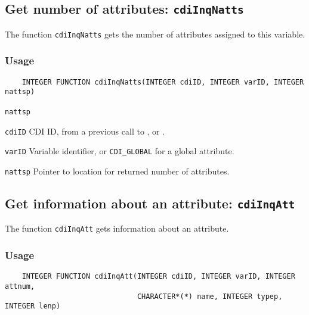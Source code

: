 

\subsection{Get number of attributes: \texttt{cdiInqNatts}}
\label{cdiInqNatts}

The function {\texttt{cdiInqNatts}} gets the number of attributes assigned to this variable.

\subsubsection*{Usage}

\begin{verbatim}
    INTEGER FUNCTION cdiInqNatts(INTEGER cdiID, INTEGER varID, INTEGER nattsp)
\end{verbatim}

\hspace*{4mm}\begin{minipage}[]{15cm}
\begin{deflist}{\texttt{nattsp}\ }
\item[\texttt{cdiID}]
CDI ID, from a previous call to {}, {} or {}.
\item[\texttt{varID}]
Variable identifier, or {\texttt{CDI\_GLOBAL}} for a global attribute.
\item[\texttt{nattsp}]
Pointer to location for returned number of attributes.

\end{deflist}
\end{minipage}


\subsection{Get information about an attribute: \texttt{cdiInqAtt}}
\label{cdiInqAtt}

The function {\texttt{cdiInqAtt}} gets information about an attribute.

\subsubsection*{Usage}

\begin{verbatim}
    INTEGER FUNCTION cdiInqAtt(INTEGER cdiID, INTEGER varID, INTEGER attnum, 
                               CHARACTER*(*) name, INTEGER typep, INTEGER lenp)
\end{verbatim}

